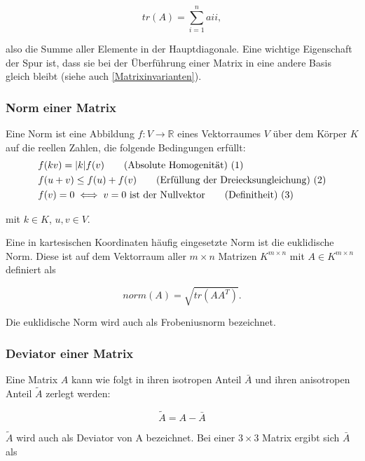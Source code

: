 \documentclass[a4paper,fontsize=12pt,toc=bib,parskip=half,ngerman]{scrartcl}
\begin{document}
\begin{equation}
	tr(A) = \sum_{i = 1}^{n} a{ii},
\end{equation}

also die Summe aller Elemente in der Hauptdiagonale. Eine wichtige Eigenschaft der Spur ist, dass sie bei der \"Uberf\"uhrung einer Matrix in eine andere Basis gleich bleibt (siehe auch \cref{Matrixinvarianten}).


\subsubsection{Norm einer Matrix}
Eine Norm ist eine Abbildung $f: V \rightarrow \mathbb{R}$ eines Vektorraumes $V$ \"uber dem K\"orper $K$ auf die reellen Zahlen, die folgende Bedingungen erf\"ullt:
\begin{align}
	&f(kv) = |k|f(v) \tag{Absolute Homogenit\"at) (\addtocounter{equation}{1}\theequation}\\
	&f(u+v) \leq f(u) + f(v) \tag{Erf\"ullung der Dreiecksungleichung) (\addtocounter{equation}{1}\theequation}\\
	&f(v) = 0 \iff v=0 \text{ ist der Nullvektor} \tag{Definitheit) (\addtocounter{equation}{1}\theequation}
\end{align}

mit $k \in K$, $u,v \in V$.


Eine in kartesischen Koordinaten h\"aufig eingesetzte Norm ist die euklidische Norm. Diese ist auf dem Vektorraum aller $m \times n$ Matrizen $K^{m\times n}$ mit $A \in K^{m\times n}$ definiert als

\begin{equation}
	norm(A) = \sqrt{tr(AA^T)}.
\end{equation}

Die euklidische Norm wird auch als \glq Frobeniusnorm\grq{} bezeichnet.

\subsubsection{Deviator einer Matrix}
Eine Matrix $A$ kann wie folgt in ihren isotropen Anteil $\bar{A}$ und ihren anisotropen Anteil $\tilde{A}$ zerlegt werden:

\begin{equation}
\tilde{A} = A - \bar{A}
\end{equation}

$\tilde{A}$ wird auch als Deviator von A bezeichnet. Bei einer $3\times 3$ Matrix ergibt sich $\bar{A}$ als
\end{document}
